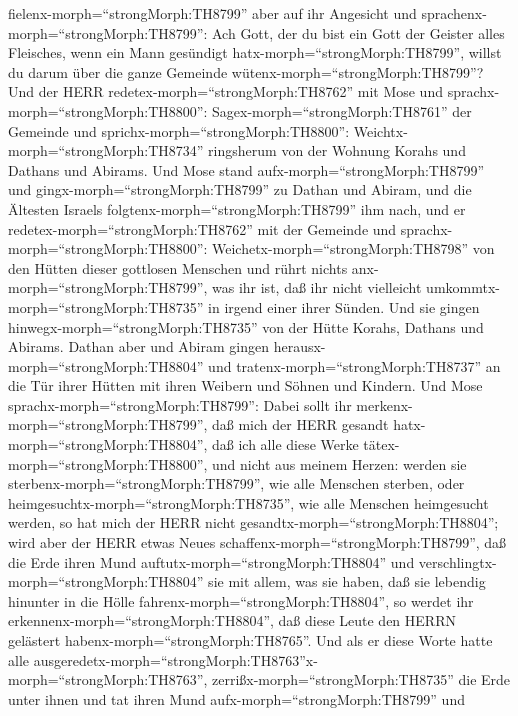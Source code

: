 fielenx-morph=``strongMorph:TH8799'' aber auf ihr Angesicht und
sprachenx-morph=``strongMorph:TH8799'': Ach Gott, der du bist ein Gott
der Geister alles Fleisches, wenn ein Mann gesündigt
hatx-morph=``strongMorph:TH8799'', willst du darum über die ganze
Gemeinde wütenx-morph=``strongMorph:TH8799''?  Und der HERR
redetex-morph=``strongMorph:TH8762'' mit Mose und
sprachx-morph=``strongMorph:TH8800'': 
Sagex-morph=``strongMorph:TH8761'' der Gemeinde und
sprichx-morph=``strongMorph:TH8800'':
Weichtx-morph=``strongMorph:TH8734'' ringsherum von der Wohnung Korahs
und Dathans und Abirams.  Und Mose stand
aufx-morph=``strongMorph:TH8799'' und gingx-morph=``strongMorph:TH8799''
zu Dathan und Abiram, und die Ältesten Israels
folgtenx-morph=``strongMorph:TH8799'' ihm nach,  und er
redetex-morph=``strongMorph:TH8762'' mit der Gemeinde und
sprachx-morph=``strongMorph:TH8800'':
Weichetx-morph=``strongMorph:TH8798'' von den Hütten dieser gottlosen
Menschen und rührt nichts anx-morph=``strongMorph:TH8799'', was ihr ist,
daß ihr nicht vielleicht umkommtx-morph=``strongMorph:TH8735'' in irgend
einer ihrer Sünden.  Und sie gingen
hinwegx-morph=``strongMorph:TH8735'' von der Hütte Korahs, Dathans und
Abirams. Dathan aber und Abiram gingen
herausx-morph=``strongMorph:TH8804'' und
tratenx-morph=``strongMorph:TH8737'' an die Tür ihrer Hütten mit ihren
Weibern und Söhnen und Kindern.  Und Mose
sprachx-morph=``strongMorph:TH8799'': Dabei sollt ihr
merkenx-morph=``strongMorph:TH8799'', daß mich der HERR gesandt
hatx-morph=``strongMorph:TH8804'', daß ich alle diese Werke
tätex-morph=``strongMorph:TH8800'', und nicht aus meinem Herzen:
 werden sie sterbenx-morph=``strongMorph:TH8799'', wie alle
Menschen sterben, oder heimgesuchtx-morph=``strongMorph:TH8735'', wie
alle Menschen heimgesucht werden, so hat mich der HERR nicht
gesandtx-morph=``strongMorph:TH8804'';  wird aber der HERR
etwas Neues schaffenx-morph=``strongMorph:TH8799'', daß die Erde ihren
Mund auftutx-morph=``strongMorph:TH8804'' und
verschlingtx-morph=``strongMorph:TH8804'' sie mit allem, was sie haben,
daß sie lebendig hinunter in die Hölle
fahrenx-morph=``strongMorph:TH8804'', so werdet ihr
erkennenx-morph=``strongMorph:TH8804'', daß diese Leute den HERRN
gelästert habenx-morph=``strongMorph:TH8765''.  Und als er
diese Worte hatte alle
ausgeredetx-morph=``strongMorph:TH8763''x-morph=``strongMorph:TH8763'',
zerrißx-morph=``strongMorph:TH8735'' die Erde unter ihnen 
und tat ihren Mund aufx-morph=``strongMorph:TH8799'' und
